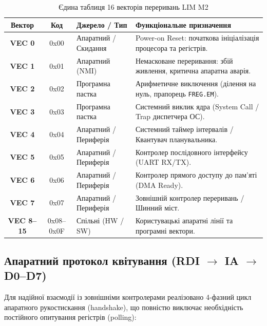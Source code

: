 \documentclass[11pt,a4paper]{article}
\newcommand{\reg}[1]{\texttt{#1}}
\begin{document}
\begin{table}[h]
\centering
\caption{Єдина таблиця 16 векторів переривань LIM M2}
\label{tab:vectors}
\begin{tabularx}{\textwidth}{>{\bfseries}c >{\ttfamily}c p{32mm}X}
\toprule
Вектор & Код & Джерело / Тип & Функціональне призначення \\
\midrule
VEC 0  & 0x00 & Апаратний / Скидання & Power-on Reset: початкова ініціалізація процесора та регістрів. \\
VEC 1  & 0x01 & Апаратний (NMI)      & Немасковане переривання: збій живлення, критична апаратна аварія. \\
VEC 2  & 0x02 & Програмна пастка     & Арифметичне виключення (ділення на нуль, прапорець \reg{FREG.EM}). \\
VEC 3  & 0x03 & Програмна пастка     & Системний виклик ядра (System Call / Trap диспетчера ОС). \\
VEC 4  & 0x04 & Апаратний / Периферія & Системний таймер інтервалів / Квантувач планувальника. \\
VEC 5  & 0x05 & Апаратний / Периферія & Контролер послідовного інтерфейсу (UART RX/TX). \\
VEC 6  & 0x06 & Апаратний / Периферія & Контролер прямого доступу до пам'яті (DMA Ready). \\
VEC 7  & 0x07 & Апаратний / Периферія & Зовнішній контролер переривань / Шинний міст. \\
VEC 8--15 & 0x08--0x0F & Спільні (HW / SW) & Користувацькі апаратні лінії та програмні вектори. \\
\bottomrule
\end{tabularx}
\end{table}

\subsection{Апаратний протокол квітування (RDI $\to$ IA $\to$ D0--D7)}
Для надійної взаємодії із зовнішніми контролерами реалізовано 4-фазний цикл апаратного рукостискання (handshake), що повністю виключає необхідність постійного опитування регістрів (polling):
\end{document}
